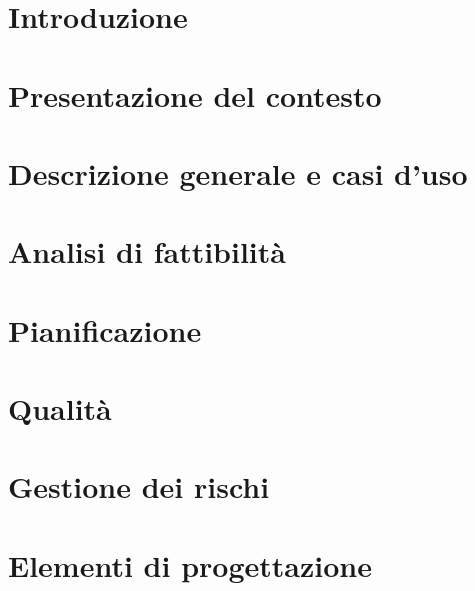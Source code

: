 

\def\DOCUMENTO 		{Piano di Progetto\\}
\def\VERSIONE 		{1.0.0\\}

\def\REDATTORI		{}

\def\VERIFICATORI	{}

\def\RESPONSABILE	{}

\def\USO			{}

\def\DISTRIBUZIONE	{\GRUPPO{}\\
					& \COMMITTENTE{}\\}

\def\DESCRIZIONE	{}

\def\INDICE		{true} 		%
\def\TABELLE	{true} 		%
\def\FIGURE		{true} 		%




\section{Introduzione}

\newpage

\section{Presentazione del contesto}

\newpage

\section{Descrizione generale e casi d'uso}

\newpage

\section{Analisi di fattibilità}

\newpage

\section{Pianificazione}

\newpage

\section{Qualità}

\newpage


\section{Gestione dei rischi}

\newpage

\section{Elementi di progettazione}



